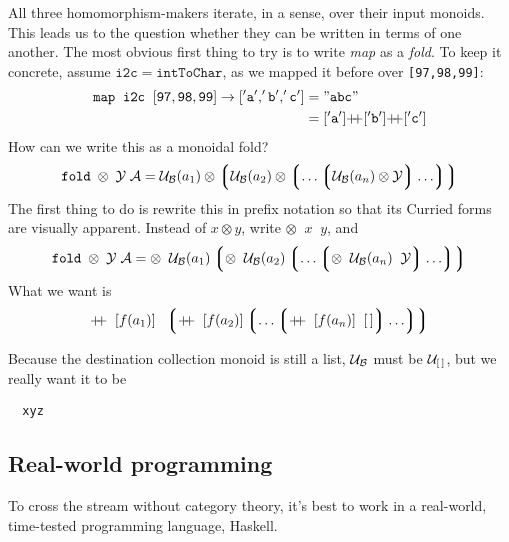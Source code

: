 All three homomorphism-makers iterate, in a sense, over their input monoids. This leads us to the question whether they can be written in terms of one another. The most obvious first thing to try is to write \emph{map} as a \emph{fold}. To keep it concrete, assume $\mathtt{i2c}=\mathtt{intToChar}$, as we mapped it before over \verb"[97,98,99]":
\begin{align*}
   \mathtt{map\;\;i2c\;\;[97,98,99]}\rightarrow
   \mathtt{['a','b','c']}&=\mathtt{"abc"} \\
   {}&= \mathtt{['a']}\pp\mathtt{['b']}\pp\mathtt{['c']}
\end{align*}
How can we write this as a monoidal fold?
\[  \mathtt{fold}\;\otimes\;\mathcal{Y}\;\mathcal{A} =
      \mathcal{U}_{\mathcal{B}}(a_1)\otimes
      \left\lgroup
      \mathcal{U}_{\mathcal{B}}(a_2)\otimes
      \left\lgroup\ldots\left\lgroup
      \mathcal{U}_{\mathcal{B}}(a_n)\otimes
      \mathit{\mathcal{Y}}
      \right\rgroup\ldots\right\rgroup
      \right\rgroup  \]
The first thing to do is rewrite this in prefix notation so that its Curried forms are visually apparent. Instead of $x\otimes y$, write $\otimes\;\;x\;\;y$, and
\[  \mathtt{fold}\;\otimes\;\mathcal{Y}\;\mathcal{A} =
      \otimes\;\;\mathcal{U}_{\mathcal{B}}(a_1)
      \left\lgroup
      \otimes\;\;\mathcal{U}_{\mathcal{B}}(a_2)
      \left\lgroup\ldots\left\lgroup
      \otimes\;\;\mathcal{U}_{\mathcal{B}}(a_n)
      \;\;\mathit{\mathcal{Y}}
      \right\rgroup\ldots\right\rgroup
      \right\rgroup  \]
What we want is
\[    \pp\;\;[f(a_1)]\;\;
      \left\lgroup
      \pp\;\;[f(a_2)]
      \left\lgroup\ldots\left\lgroup
      \pp\;\;[f(a_n)]
      \;\;\emptylist
      \right\rgroup\ldots\right\rgroup
      \right\rgroup  \]


Because the destination collection monoid is still a list, $\mathcal{U}_{\mathcal{B}}$ must be $\mathcal{U}_{\mathcal{[\,]}}$, but we really want it to be


\begin{verbatim}
  xyz
\end{verbatim}

\subsection{\color{Red}Real-world programming}


To cross the stream without category theory, it's best to work in a real-world, time-tested programming language, Haskell.


